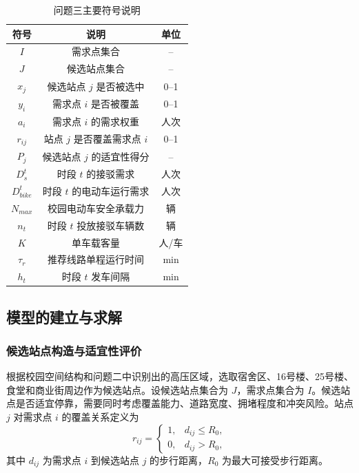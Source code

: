 \documentclass[UTF8,zihao=-4,a4paper]{ctexart}
\numberwithin{table}{section}
\numberwithin{figure}{section}
\numberwithin{equation}{section}
\begin{document}
\begin{table}[H]
\footnotesize
\centering
\caption{问题三主要符号说明}
\label{tab:symbols_q3}
\begin{tabular}{ccc}
\toprule
\textbf{符号} & \textbf{说明} & \textbf{单位} \\
\midrule
$I$ & 需求点集合 & -- \\
$J$ & 候选站点集合 & -- \\
$x_j$ & 候选站点 $j$ 是否被选中 & 0--1 \\
$y_i$ & 需求点 $i$ 是否被覆盖 & 0--1 \\
$a_i$ & 需求点 $i$ 的需求权重 & 人次 \\
$r_{ij}$ & 站点 $j$ 是否覆盖需求点 $i$ & 0--1 \\
$P_j$ & 候选站点 $j$ 的适宜性得分 & -- \\
$D_s^t$ & 时段 $t$ 的接驳需求 & 人次 \\
$D_{bike}^t$ & 时段 $t$ 的电动车运行需求 & 人次 \\
$N_{max}$ & 校园电动车安全承载力 & 辆 \\
$n_t$ & 时段 $t$ 投放接驳车辆数 & 辆 \\
$K$ & 单车载客量 & 人/车 \\
$\tau_r$ & 推荐线路单程运行时间 & min \\
$h_t$ & 时段 $t$ 发车间隔 & min \\
\bottomrule
\end{tabular}
\end{table}

\subsection{模型的建立与求解}

\subsubsection{候选站点构造与适宜性评价}

根据校园空间结构和问题二中识别出的高压区域，选取宿舍区、16号楼、25号楼、食堂和商业街周边作为候选站点。设候选站点集合为 $J$，需求点集合为 $I$。候选站点是否适宜停靠，需要同时考虑覆盖能力、道路宽度、拥堵程度和冲突风险。站点 $j$ 对需求点 $i$ 的覆盖关系定义为
\begin{equation}
r_{ij}=\begin{cases}
1, & d_{ij}\le R_0,\\
0, & d_{ij}>R_0,
\end{cases}
\end{equation}
其中 $d_{ij}$ 为需求点 $i$ 到候选站点 $j$ 的步行距离，$R_0$ 为最大可接受步行距离。
\end{document}
